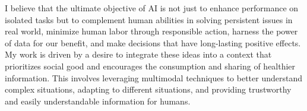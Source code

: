 
I believe that the ultimate objective of AI is not just to enhance performance on isolated tasks but to complement human abilities in solving persistent issues in real world, minimize human labor through responsible action, harness the power of data for our benefit, and make decisions that have long-lasting positive effects. My work is driven by a desire to integrate these ideas into a context that prioritizes social good and encourages the consumption and sharing of healthier information. This involves leveraging multimodal techniques to better understand complex situations, adapting to different situations, and providing trustworthy and easily understandable information for humans.


